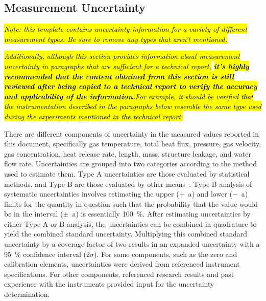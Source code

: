 \documentclass[12pt,oneside]{book}
\begin{document}
\subsection{Measurement Uncertainty}
\label{subsec:uncertainty}

\textit{\hl{Note: this template contains uncertainty information for a variety of different measurement types. Be sure to remove any types that aren't mentioned.}} 

\textit{\hl{Additionally, although this section provides information about measurement uncertainty in paragraphs that are sufficient for a technical report,}\textbf{\hl{ it's highly recommended that the content obtained from this section is still reviewed after being copied to a technical report to verify the accuracy and applicability of the information.}}\hl{For example, it should be verified that the instrumentation described in the paragraphs below resemble the same type used during the experiments mentioned in the technical report.}}

There are different components of uncertainty in the measured values reported in this document, specifically gas temperature, total heat flux, pressure, gas velocity, gas concentration, heat release rate, length, mass, structure leakage, and water flow rate. Uncertainties are grouped into two categories according to the method used to estimate them. Type A uncertainties are those evaluated by statistical methods, and Type B are those evaluated by other means~\cite{Taylor&Kuyatt:1994}. Type B analysis of systematic uncertainties involves estimating the upper ($+$~a) and lower ($-$~a) limits for the quantity in question such that the probability that the value would be in the interval ($\pm$~a) is essentially 100~\%. After estimating uncertainties by either Type A or B analysis, the uncertainties can be combined in quadrature to yield the combined standard uncertainty. Multiplying this combined standard uncertainty by a coverage factor of two results in an expanded uncertainty with a 95~\% confidence interval (2$\sigma$). For some components, such as the zero and calibration elements, uncertainties were derived from referenced instrument specifications. For other components, referenced research results and past experience with the instruments provided input for the uncertainty determination.
\end{document}
